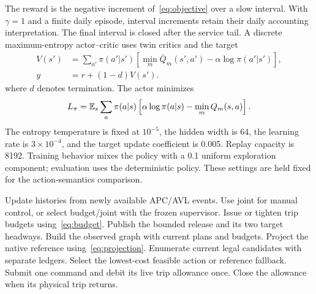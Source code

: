 The reward is the negative increment of~\eqref{eq:objective} over a slow interval. With $\gamma=1$ and a finite daily episode, interval increments retain their daily accounting interpretation. The final interval is closed after the service tail. A discrete maximum-entropy actor--critic uses twin critics and the target
\begin{align}
 V(s')&=\sum_{a'}\pi(a'|s')\left[\min_m\bar Q_m(s',a')-\alpha\log\pi(a'|s')\right],\\
 y&=r+(1-d)V(s').
\end{align}
where $d$ denotes termination. The actor minimizes
\begin{equation}
 L_\pi=\mathbb{E}_s\sum_a\pi(a|s)\left[\alpha\log\pi(a|s)-\min_m Q_m(s,a)\right].
\end{equation}
The entropy temperature is fixed at $10^{-5}$, the hidden width is 64, the learning rate is $3\times10^{-4}$, and the target update coefficient is 0.005. Replay capacity is 8192. Training behavior mixes the policy with a 0.1 uniform exploration component; evaluation uses the deterministic policy. These settings are held fixed for the action-semantics comparison.

\begin{algorithm}[t]
\caption{The shared timetable--holding interface}
\label{alg:control}
\begin{algorithmic}[1]
\STATE Update histories from newly available APC/AVL events.
\STATE Use joint for manual control, or select budget/joint with the frozen supervisor.
\STATE Issue or tighten trip budgets using~\eqref{eq:budget}.
\STATE Publish the bounded release and its two target headways.
\ENDIF
\ENDIF
{}
\STATE Build the observed graph with current plans and budgets.
\STATE Project the native reference using~\eqref{eq:projection}.
\STATE Enumerate current legal candidates with separate ledgers.
\STATE Select the lowest-cost feasible action or reference fallback.
\STATE Submit one command and debit its live trip allowance once.
\ENDIF
\STATE Close the allowance when its physical trip returns.
\end{algorithmic}
\end{algorithm}

